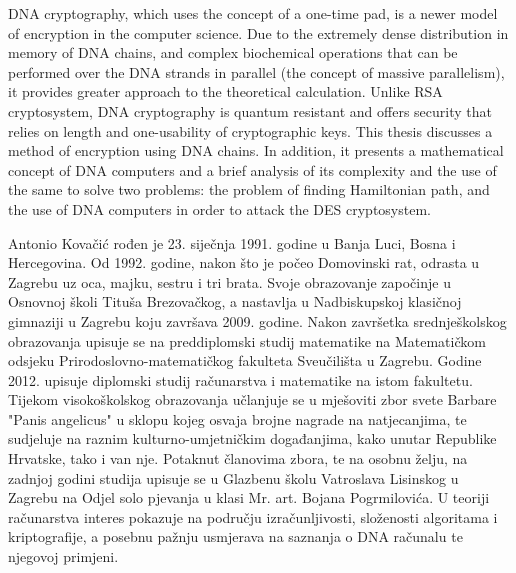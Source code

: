 \documentclass[a4paper,oneside,12pt]{memoir} %
\begin{document}
\begin{spacing}{1.5}
\begin{summary}
DNA cryptography, which uses the concept of a one-time pad, is a newer model of encryption in the computer science. Due to the extremely dense distribution in memory of DNA chains, and complex biochemical operations that can be performed over the DNA strands in parallel (the concept of massive parallelism), it provides greater approach to the theoretical calculation. Unlike RSA cryptosystem, DNA cryptography is quantum resistant and offers security that relies on length and one-usability of cryptographic keys. This thesis discusses a method of encryption using DNA chains. In addition, it presents a mathematical concept of DNA computers and a brief analysis of its complexity and the use of the same to solve two problems: the problem of finding Hamiltonian path, and the use of DNA computers in order to attack the DES cryptosystem.
\end{summary}
\begin{cv}
Antonio Kovačić rođen je 23. siječnja 1991. godine u Banja Luci, Bosna i Hercegovina. Od 1992. godine, nakon što je počeo Domovinski rat, odrasta u Zagrebu uz oca, majku, sestru i tri brata. Svoje obrazovanje započinje u Osnovnoj školi Tituša Brezovačkog, a nastavlja u Nadbiskupskoj klasičnoj gimnaziji u Zagrebu koju završava 2009. godine. Nakon završetka srednješkolskog obrazovanja upisuje se na preddiplomski studij matematike na Matematičkom odsjeku Prirodoslovno-matematičkog fakulteta Sveučilišta u Zagrebu. Godine 2012. upisuje diplomski studij računarstva i matematike na istom fakultetu. Tijekom visokoškolskog obrazovanja učlanjuje se u mješoviti zbor svete Barbare "Panis angelicus" u sklopu kojeg osvaja brojne nagrade na natjecanjima, te sudjeluje na raznim kulturno-umjetničkim događanjima, kako unutar Republike Hrvatske, tako i van nje. Potaknut članovima zbora, te na osobnu želju, na zadnjoj godini studija upisuje se u Glazbenu školu Vatroslava Lisinskog u Zagrebu na Odjel solo pjevanja u klasi Mr. art. Bojana Pogrmilovića. U teoriji računarstva interes pokazuje na području izračunljivosti, složenosti algoritama i kriptografije, a posebnu pažnju usmjerava na saznanja o DNA računalu te njegovoj primjeni.
\end{cv}
\end{spacing}
\end{document}
